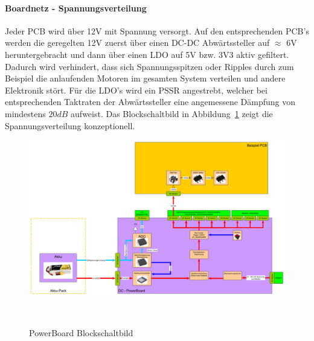 \documentclass[main.tex]{subfiles} %
\begin{document}
\paragraph{Boardnetz - Spannungsverteilung}
Jeder PCB wird über 12V mit Spannung versorgt. Auf den entsprechenden PCB's
werden die geregelten 12V zuerst über einen DC-DC Abwärtssteller auf $\approx$
6V heruntergebracht und dann über einen LDO auf 5V bzw. 3V3 aktiv gefiltert.
Dadurch wird verhindert, dass sich Spannungsspitzen oder Ripples durch zum
Beispiel die anlaufenden Motoren im gesamten System verteilen und andere
Elektronik stört. Für die LDO's wird ein PSSR angestrebt, welcher bei
entsprechenden Taktraten der Abwärtssteller eine angemessene Dämpfung von
mindestens $20dB$ aufweist. Das Blockschaltbild in
Abbildung~\ref{PowerBoard_Blockschaltbild} zeigt die Spannungsverteilung
konzeptionell.

\begin{figure}[H]
    \centering
    \includegraphics[width = 1\linewidth]{fig_Boardnetz/PowerBoard-Blockschaltbild.pdf}
    \caption{PowerBoard Blockschaltbild}~\label{PowerBoard_Blockschaltbild}
\end{figure}
\end{document}
